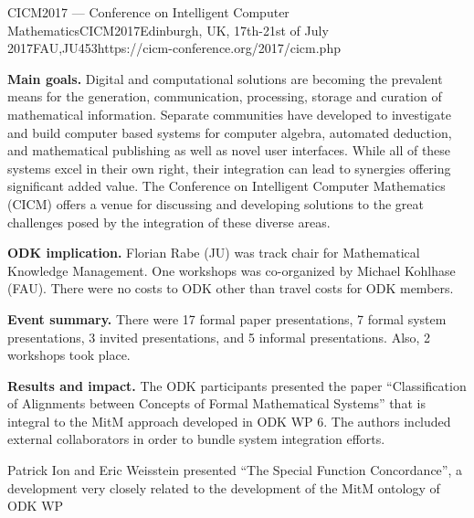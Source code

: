 \begin{event}{CICM2017 --- Conference on Intelligent Computer Mathematics}{CICM2017}{Edinburgh, UK, 17th-21st of July 2017}{FAU,JU}{45}{3}{https://cicm-conference.org/2017/cicm.php}

\textbf{Main goals.}
Digital and computational solutions are becoming the prevalent means for the generation, communication, processing, storage and curation of mathematical information.
Separate communities have developed to investigate and build computer based systems for computer algebra, automated deduction, and mathematical publishing as well as novel user interfaces.
While all of these systems excel in their own right, their integration can lead to synergies offering significant added value.
The Conference on Intelligent Computer Mathematics (CICM) offers a venue for discussing and developing solutions to the great challenges posed by the integration of these diverse areas. 

\textbf{ODK implication.}
Florian Rabe (JU) was track chair for Mathematical Knowledge Management.
One workshops was co-organized by Michael Kohlhase (FAU).
There were no costs to ODK other than travel costs for ODK members.

\textbf{Event summary.}
There were 17 formal paper presentations, 7 formal system presentations, 3 invited presentations, and 5 informal presentations.
Also, 2 workshops took place.

\textbf{Results and impact.}
The ODK participants presented the paper ``Classification of Alignments between Concepts of Formal Mathematical Systems'' that is integral to the MitM approach developed in ODK WP 6.
The authors included external collaborators in order to bundle system integration efforts.

Patrick Ion and Eric Weisstein presented ``The Special Function Concordance'', a development very closely related to the development of the MitM ontology of ODK WP 
\end{event}
